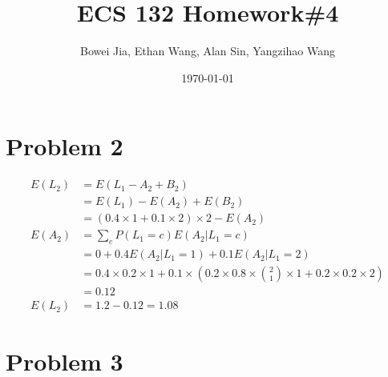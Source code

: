 \documentclass[11pt]{article}
\title{ECS 132 Homework\#4}
\author{Bowei Jia, Ethan Wang, Alan Sin, Yangzihao Wang}
\date{\today}
\begin{document}
\maketitle

\section*{Problem 2}
\begin{align*}
E(L_2) &= E(L_1 - A_2 + B_2) \\
&=E(L_1) - E(A_2) + E(B_2) \\
&=(0.4\times 1 + 0.1\times 2) \times 2 - E(A_2) \\
E(A_2) &= \sum_{c}P(L_1=c)E(A_2|L_1=c) \\
&=0 + 0.4E(A_2|L_1=1) + 0.1E(A_2|L_1=2) \\
&=0.4 \times 0.2 \times 1 + 0.1 \times (0.2 \times 0.8 \times \binom{2}{1} \times 1 + 0.2 \times 0.2 \times 2) \\
&= 0.12\\
E(L_2) &= 1.2 - 0.12 = 1.08
\end{align*}

\section*{Problem 3}
\end{document}
